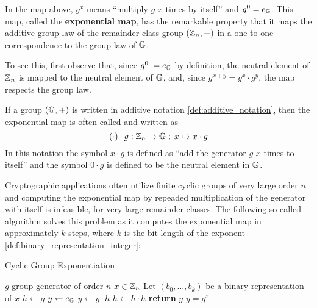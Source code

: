 In the map above,  $g^x$ means ``multiply $g$ $x$-times by itself'' and $g^0=e_{\mathbb{G}}$. This map, called the \textbf{exponential map}, has the remarkable property that it maps the additive group law of the remainder class group $(\mathbb{Z}_n,+)$ in a one-to-one correspondence to the group law of $\mathbb{G}$.

To see this, first observe that, since $g^0:=e_{\mathbb{G}}$ by definition, the neutral element of $\mathbb{Z}_n$ is mapped to the neutral element of $\mathbb{G}$, and, since $g^{x+y}=g^x\cdot g^y$, the map respects the group law.
\begin{remark}
\label{def:scalar_multiplication} If a group $(\mathbb{G},+)$ is written in additive notation \ref{def:additive_notation}, then the exponential map is often called  and written as
\begin{equation}\label{scalarmultiplication}
(\cdot)\cdot g: \mathbb{Z}_n \to \mathbb{G}\;;\; x \mapsto x\cdot g
\end{equation}
In this notation the symbol $x\cdot g$  is defined as ``add the generator $g$ $x$-times to itself'' and the symbol $0\cdot g$ is defined to be the neutral element in $\mathbb{G}$.
\end{remark}

Cryptographic applications often utilize finite cyclic groups of very large order $n$ and computing the exponential map by repeaded multiplication of the generator with itself is infeasible, for very large remainder classes. The following so called  algorithm solves this problem as it computes the exponential map in approximately $k$ steps, where $k$ is the bit length of the exponent \ref{def:binary_representation_integer}:

\begin{algorithm}\caption{Cyclic Group Exponentiation}
\label{alg_square-and-mul}
\begin{algorithmic}[0]
\Require $g$ group generator of order $n$
\Require $x \in \mathbb{Z}_n$ 
\State Let $(b_0,\ldots,b_k)$ be a binary representation of $x$ 
\State $h \gets g$
\State $y \gets e_{\mathbb{G}}$
		\State $y\gets y\cdot h$ 
	\EndIf
	\State $h \gets h\cdot h$ 
\EndFor
\State \textbf{return} $y$
\EndProcedure
\Ensure $ y = g^x$
\end{algorithmic}
\end{algorithm}

